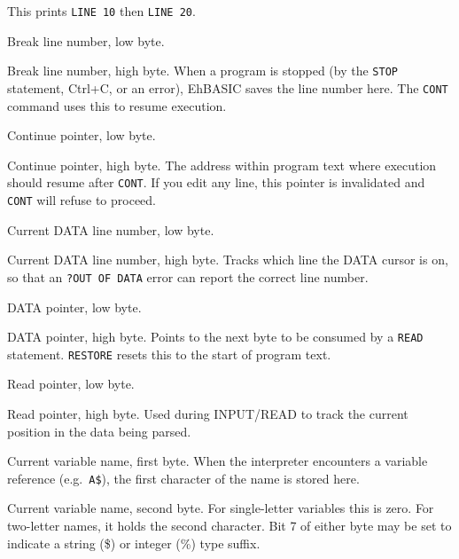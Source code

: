 This prints \texttt{LINE 10} then \texttt{LINE 20}.


Break line number, low byte.


Break line number, high byte.  When a program is stopped (by the \texttt{STOP}
statement, Ctrl+C, or an error), EhBASIC saves the line number here.  The
\texttt{CONT} command uses this to resume execution.


Continue pointer, low byte.


Continue pointer, high byte.  The address within program text where execution
should resume after \texttt{CONT}.  If you edit any line, this pointer is
invalidated and \texttt{CONT} will refuse to proceed.


Current DATA line number, low byte.


Current DATA line number, high byte.  Tracks which line the DATA cursor is on,
so that an \texttt{?OUT OF DATA} error can report the correct line number.


DATA pointer, low byte.


DATA pointer, high byte.  Points to the next byte to be consumed by a
\texttt{READ} statement.  \texttt{RESTORE} resets this to the start of program
text.


Read pointer, low byte.


Read pointer, high byte.  Used during INPUT/READ to track the current position
in the data being parsed.


Current variable name, first byte.  When the interpreter encounters a variable
reference (e.g.\ \texttt{A\$}), the first character of the name is stored here.


Current variable name, second byte.  For single-letter variables this is zero.
For two-letter names, it holds the second character.  Bit 7 of either byte may
be set to indicate a string (\$) or integer (\%) type suffix.

